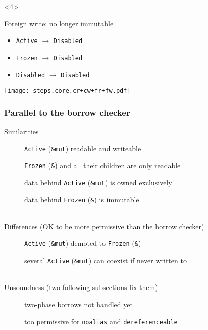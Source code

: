 \begin{frame}[t]
    \begin{onlyenv}<4>
        \begin{block}{Foreign write: no longer immutable}
            \begin{itemize}
                \item \texttt{Active} \(\to\) \texttt{Disabled}
                \item \texttt{Frozen} \(\to\) \texttt{Disabled}
                \item \texttt{Disabled} \(\to\) \texttt{Disabled}
            \end{itemize}
        \end{block}
        \texttt{[image: steps.core.cr+cw+fr+fw.pdf]}
    \end{onlyenv}
\end{frame}

\begin{frame}
    \frametitle{Parallel to the borrow checker}
    Similarities
    \hspace{-5em}
    \begin{description}
        \item[\cmark] \texttt{Active} (\texttt{\&mut}) readable and writeable
        \item[\cmark] \texttt{Frozen} (\texttt{\&}) and all their children are only readable
        \item[\cmark] data behind \texttt{Active} (\texttt{\&mut}) is owned exclusively
        \item[\cmark] data behind \texttt{Frozen} (\texttt{\&}) is immutable
    \end{description}~\\

    Differences (OK to be more permissive than the borrow checker)
    \hspace{-5em}
    \begin{description}
        \item[\xmark] \texttt{Active} (\texttt{\&mut}) demoted to \texttt{Frozen} (\texttt{\&})
        \item[\xmark] several \texttt{Active} (\texttt{\&mut}) can coexist if never written to
    \end{description}~\\

    Unsoundness (two following subsections fix them)
    \hspace{-5em}
    \begin{description}
        \item[\xmark] two-phase borrows not handled yet
        \item[\xmark] too permissive for \texttt{noalias} and \texttt{dereferenceable}
    \end{description}~\\

\end{frame}

